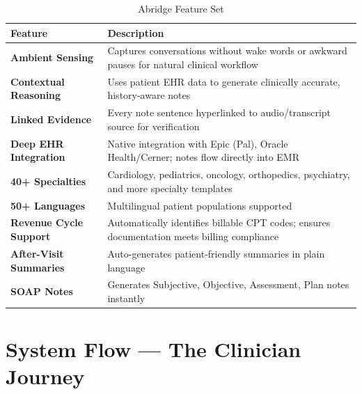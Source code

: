 \documentclass[12pt,a4paper]{article}
\begin{document}
\begin{table}[H]
\centering
\renewcommand{\arraystretch}{1.3}
\begin{tabularx}{\textwidth}{lX}
\toprule
\textbf{Feature} & \textbf{Description} \\
\midrule
\textbf{Ambient Sensing} & Captures conversations without wake words or awkward pauses for natural clinical workflow \\
\textbf{Contextual Reasoning} & Uses patient EHR data to generate clinically accurate, history-aware notes \\
\textbf{Linked Evidence} & Every note sentence hyperlinked to audio/transcript source for verification \\
\textbf{Deep EHR Integration} & Native integration with Epic (Pal), Oracle Health/Cerner; notes flow directly into EMR \\
\textbf{40+ Specialties} & Cardiology, pediatrics, oncology, orthopedics, psychiatry, and more specialty templates \\
\textbf{50+ Languages} & Multilingual patient populations supported \\
\textbf{Revenue Cycle Support} & Automatically identifies billable CPT codes; ensures documentation meets billing compliance \\
\textbf{After-Visit Summaries} & Auto-generates patient-friendly summaries in plain language \\
\textbf{SOAP Notes} & Generates Subjective, Objective, Assessment, Plan notes instantly \\
\bottomrule
\end{tabularx}
\caption{Abridge Feature Set}
\end{table}

\newpage

\section{System Flow --- The Clinician Journey}
\end{document}
